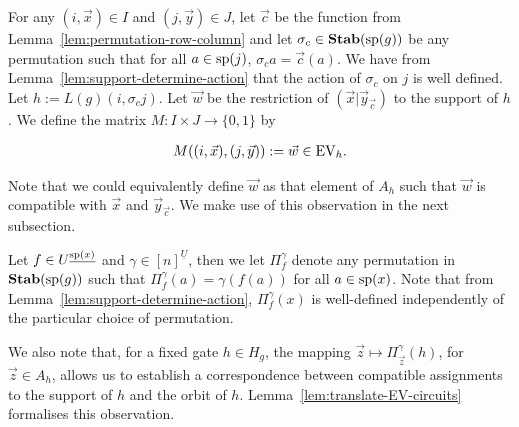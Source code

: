 \documentclass[../main/thesis.tex]{subfiles}
\begin{document}
For any $(i, \vec{x}) \in I$ and $(j, \vec{y}) \in J$, let $\vec{c}$ be the
function from Lemma~\ref{lem:permutation-row-column} and let $\sigma_{c} \in
\text{\textbf{Stab}} (\text{sp} (g))$ be any permutation such that for all $a \in \text{sp}(j)$, $\sigma_{c}
a = \vec{c}(a)$. We have from Lemma~\ref{lem:support-determine-action} that the
action of $\sigma_{c}$ on $j$ is well defined. Let $h := L(g)(i, \sigma_c j)$.
Let $\vec{w}$ be the restriction of $(\vec{x} \vert \vec{y}_{\vec{c}})$ to the
support of $h$. We define the matrix $M : I \times J \rightarrow \{0,1\}$ by

\begin{align*}
	M((i , \vec{x}), (j, \vec{y})) := \vec{w} \in \text{EV}_h. 
\end{align*}

Note that we could equivalently define $\vec{w}$ as that element of $A_h$ such
that $\vec{w}$ is compatible with $\vec{x}$ and $\vec{y}_{\vec{c}}$. We make use
of this observation in the next subsection.

Let $f \in U^{\underline{\text{sp}(x)}}$ and $\gamma \in [n]^{\underline{U}}$, then
we let $\Pi^{\gamma}_{f}$ denote any permutation in $\text{\textbf{Stab}} (\text{sp} (g))$ such that
$\Pi^{\gamma}_f (a) = \gamma (f(a))$ for all $a \in \text{sp}(x)$. Note that from
Lemma~\ref{lem:support-determine-action}, $\Pi^{\gamma}_f(x)$ is well-defined
independently of the particular choice of permutation.

We also note that, for a fixed gate $h \in H_g$, the mapping $\vec{z} \mapsto
\Pi^{\gamma}_{\vec{z}}(h)$, for $\vec{z} \in A_h$, allows us to establish a
correspondence between compatible assignments to the support of $h$ and the
orbit of $h$. Lemma~\ref{lem:translate-EV-circuits} formalises this observation.
\end{document}
